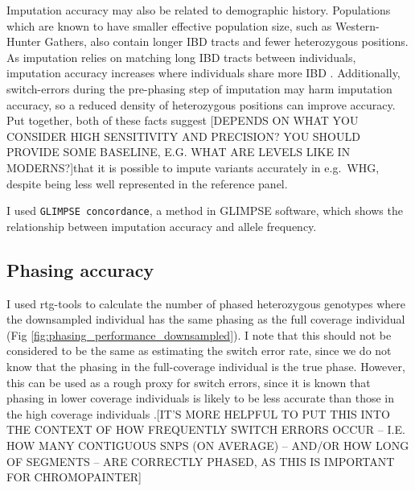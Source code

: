 Imputation accuracy may also be related to demographic history. Populations which are known to have smaller effective population size, such as Western-Hunter Gathers, also contain longer IBD tracts and fewer heterozygous positions. As imputation relies on matching long IBD tracts between individuals, imputation accuracy increases where individuals share more IBD \cite{kong2008detection}. Additionally, switch-errors during the pre-phasing step of imputation may harm imputation accuracy, so a reduced density of heterozygous positions can improve accuracy. Put together, both of these facts suggest {\color{red}[DEPENDS ON WHAT YOU CONSIDER HIGH SENSITIVITY AND PRECISION? YOU SHOULD PROVIDE SOME BASELINE, E.G. WHAT ARE LEVELS LIKE IN MODERNS?]that it is possible to impute variants accurately in e.g.\ WHG,} despite being less well represented in the reference panel.

I used \texttt{GLIMPSE concordance}, a method in GLIMPSE software, which shows the relationship between imputation accuracy and allele frequency. 

\subsection{Phasing accuracy}

I used rtg-tools to calculate the number of phased heterozygous genotypes where the downsampled individual has the same phasing as the full coverage individual (Fig \ref{fig:phasing_performance_downsampled}). I note that this should not be considered to be the same as estimating the switch error rate, since we do not know that the phasing in the full-coverage individual is the true phase. However, this can be used as a rough proxy for switch errors, since it is known that phasing in lower coverage individuals is likely to be less accurate than those in the high coverage individuals \cite{rubinacci2021efficient}.{\color{red}[IT'S MORE HELPFUL TO PUT THIS INTO THE CONTEXT OF HOW FREQUENTLY SWITCH ERRORS OCCUR -- I.E. HOW MANY CONTIGUOUS SNPS (ON AVERAGE) -- AND/OR HOW LONG OF SEGMENTS -- ARE CORRECTLY PHASED, AS THIS IS IMPORTANT FOR CHROMOPAINTER]}

